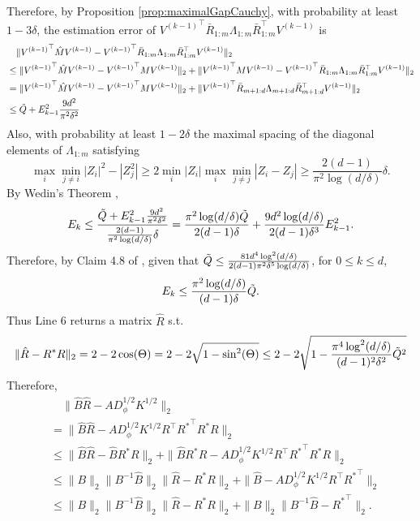 Therefore, by Proposition \ref{prop:maximalGapCauchy}, with probability at least $1-3\delta$, 
the estimation error of ${V^{(k-1)}}^\top\bar{R}_{1:m}\Lambda_{1:m} \bar{R}_{1:m}^{\top} V^{(k-1)}$ is 
\begin{align*}
& \quad \| {V^{(k-1)}}^\top \hat{M}V^{(k-1)} - {V^{(k-1)}}^\top\bar{R}_{1:m}\Lambda_{1:m} \bar{R}_{1:m}^{\top} V^{(k-1)} \|_2 \\
& \le \|{V^{(k-1)}}^\top \hat{M}V^{(k-1)} - {V^{(k-1)}}^\top MV^{(k-1)}\|_2 + \| {V^{(k-1)}}^\top MV^{(k-1)} -{V^{(k-1)}}^\top\bar{R}_{1:m}\Lambda_{1:m} \bar{R}_{1:m}^{\top} V^{(k-1)} \|_2 \\
&  = \|{V^{(k-1)}}^\top \hat{M}V^{(k-1)} - {V^{(k-1)}}^\top MV^{(k-1)}\|_2 + \|{V^{(k-1)}}^\top\bar{R}_{m+1:d}\Lambda_{m+1:d}\bar{R}_{m+1:d}^{\top} V^{(k-1)} \|_2 \\
& \le \tilde{Q} + E_{k-1}^2 \frac{9d^2}{\pi^2\delta^2} 
\end{align*}
Also, with probability at least $1-2\delta$ the maximal spacing of the diagonal elements of $\Lambda_{1:m}$ satisfying
\[
\max_i\min_{j\neq i} |Z_i|^2 - |Z_j^2| \ge 2\min_i |Z_i| \max_i\min_{j\neq j} |Z_i - Z_j| \ge \frac{2(d-1)}{\pi^2 \log(d/\delta)}\delta.
\] 
By Wedin's Theorem \citep{stewart1990matrix}, 
\[
E_k \le \frac{\tilde{Q} + E_{k-1}^2 \frac{9d^2}{\pi^2\delta^2} }{\frac{2(d-1)}{\pi^2 \log(d/\delta)}\delta} = \frac{\pi^2 \log(d/\delta)\tilde{Q}}{2(d-1)\delta} + \frac{9d^2 \log(d/\delta)}{2(d-1)\delta^3}E_{k-1}^2.
\]
Therefore, by Claim 4.8 of \citet{vempala2014max}, given that $\tilde{Q}\le  \frac{81d^4\log^2(d/\delta)}{2(d-1)\pi^2\delta^5\log(d/\delta)}$, for $0\le k\le d$,
\[
E_k \le \frac{\pi^2 \log(d/\delta)}{(d-1)\delta} \tilde{Q}. 
\]
Thus Line 6 returns a matrix $\hat{R}$ s.t.
\[
\|\hat{R} - R^*R\|_2 = 2-2\cos(\Theta)= 2 - 2\sqrt{1-\sin^2(\Theta)} \le 2 - 2\sqrt{1-\frac{\pi^4 \log^2(d/\delta)}{(d-1)^2\delta^2} \tilde{Q}^2}
\]
Therefore,
\begin{align*}
& \quad \| \hat{B}\hat{R} - AD_{\phi}^{1/2}K^{1/2}\|_2 \\
& = \| \hat{B}\hat{R} - AD_{\phi}^{1/2}K^{1/2}R^{\top}{R^*}^{\top}R^*R\|_2 \\
& \le \| \hat{B}\hat{R} -  \hat{B}R^*R\|_2 + \|\hat{B}R^*R - AD_{\phi}^{1/2}K^{1/2}R^{\top}{R^*}^{\top}R^*R \|_2 \\
& \le \|B\|_2\|B^{-1}\hat{B}\|_2\|\hat{R} - R^*R\|_2 + \|\hat{B} - AD_{\phi}^{1/2}K^{1/2}R^{\top}{R^*}^{\top}\|_2 \\
& \le  \|B\|_2\|B^{-1}\hat{B}\|_2\|\hat{R} - R^*R\|_2 +\|B\|_2\|B^{-1}\hat{B} - {R^*}^{\top}\|_2.
\end{align*}

